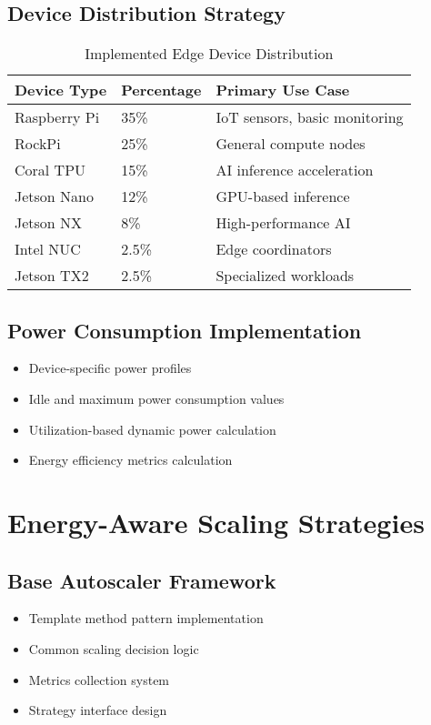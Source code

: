 \documentclass[12pt,a4paper]{report}
\begin{document}
\subsection{Device Distribution Strategy}

\begin{table}[h]
\centering
\caption{Implemented Edge Device Distribution}
\begin{tabular}{lll}
\toprule
\textbf{Device Type} & \textbf{Percentage} & \textbf{Primary Use Case} \\
\midrule
Raspberry Pi & 35\% & IoT sensors, basic monitoring \\
RockPi & 25\% & General compute nodes \\
Coral TPU & 15\% & AI inference acceleration \\
Jetson Nano & 12\% & GPU-based inference \\
Jetson NX & 8\% & High-performance AI \\
Intel NUC & 2.5\% & Edge coordinators \\
Jetson TX2 & 2.5\% & Specialized workloads \\
\bottomrule
\end{tabular}
\end{table}

\subsection{Power Consumption Implementation}
\begin{itemize}[leftmargin=1cm]
    \item Device-specific power profiles
    \item Idle and maximum power consumption values
    \item Utilization-based dynamic power calculation
    \item Energy efficiency metrics calculation
\end{itemize}

\section{Energy-Aware Scaling Strategies}

\subsection{Base Autoscaler Framework}
\begin{itemize}[leftmargin=1cm]
    \item Template method pattern implementation
    \item Common scaling decision logic
    \item Metrics collection system
    \item Strategy interface design
\end{itemize}
\end{document}
